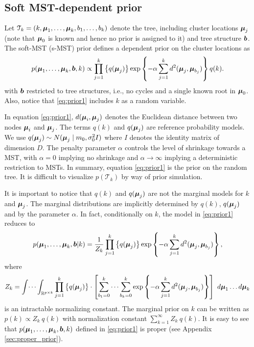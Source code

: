 \subsection{Soft MST-dependent prior}
\label{sec:soft_mst}


Let $\mathcal{T}_k = (k, \mbox{\boldmath $\mu$}_1, \dots, \mbox{\boldmath $\mu$}_k, b_1, \dots, b_{k})$
denote the tree, including cluster locations $\mbox{\boldmath $\mu$}_j$ (note that $\mbox{\boldmath $\mu$}_0$ is known and hence no prior is assigned to it) and tree
structure $\mbox{\boldmath $b$}$.
The soft-MST (s-MST) prior defines a dependent prior on the cluster
locations as 
\begin{equation}
  p(\mbox{\boldmath $\mu$}_1, \dots, \mbox{\boldmath $\mu$}_k, \mbox{\boldmath $b$}, k) \propto \prod_{j=1}^k
  \left\{ q(\mbox{\boldmath $\mu$}_j) \right\} \exp\left\{- \alpha \sum_{j=1}^k
    d^2(\mbox{\boldmath $\mu$}_j, \mbox{\boldmath $\mu$}_{b_j}) \right\} q(k).
\label{eq:prior1}
\end{equation}
with $\mbox{\boldmath $b$}$ restricted to tree structures, i.e., no cycles and a single known root in $\mbox{\boldmath $\mu$}_0$. Also, notice that \eqref{eq:prior1} includes $k$ as a random variable.

In equation \eqref{eq:prior1}, $d(\mbox{\boldmath $\mu$}_i, \mbox{\boldmath $\mu$}_j)$ denotes the Euclidean distance between two nodes $\mbox{\boldmath $\mu$}_i$ and $\mbox{\boldmath $\mu$}_j$. The terms $q(k)$ and $q(\mbox{\boldmath $\mu$}_j)$ are reference probability models. We use $q(\mbox{\boldmath $\mu$}_j)\sim N(\mbox{\boldmath $\mu$}_j \mid m_0, \sigma^2_0 I)$ where $I$ denotes the identity matrix of dimension $D$. The penalty parameter $\alpha$ controls the level of shrinkage towards a MST, with $\alpha=0$ implying no shrinkage and $\alpha \rightarrow \infty$ implying a deterministic restriction to MSTs. In summary, equation \eqref{eq:prior1} is the prior on the random tree. It is difficult to visualize $p(\mathcal{T}_k)$ by way of prior simulation.

It is important to notice that $q(k)$ and $q(\mbox{\boldmath $\mu$}_j)$ are not the marginal models for $k$ and $\mbox{\boldmath $\mu$}_j$. The marginal distributions are implicitly determined by $q(k)$, $q(\mbox{\boldmath $\mu$}_j)$ and by the parameter $\alpha$. In fact, conditionally on $k$, the model in \eqref{eq:prior1} reduces to 
$$
p(\mbox{\boldmath $\mu$}_1, \dots, \mbox{\boldmath $\mu$}_k, \mbox{\boldmath $b$} | k) = \frac{1}{Z_{k}}
\prod_{j=1}^k \left\{ q(\mbox{\boldmath $\mu$}_j) \right\} \exp\left\{- \alpha
  \sum_{j=1}^k d^2(\mbox{\boldmath $\mu$}_j, \mbox{\boldmath $\mu$}_{b_j}) \right\},
$$
where
$$
Z_{k} = \int \dots \int_{\mathbb{R}^{p \times k}} \prod_{j=1}^k \left\{
  q(\mbox{\boldmath $\mu$}_j)\right\} \cdot \left[ \sum_{b_1=0}^k \dots
  \sum_{b_k=0}^k \exp\left\{- \alpha \sum_{j=1}^k d^2(\mbox{\boldmath $\mu$}_j,
    \mbox{\boldmath $\mu$}_{b_j}) \right\} \right] \ d\mbox{\boldmath $\mu$}_1 \dots  d\mbox{\boldmath $\mu$}_k
$$
is an intractable normalizing constant. The marginal prior on $k$ can
be written as $ p(k) \propto Z_{k} \ q(k)$ with normalization constant $\sum^{\infty}_{k=1} Z_{k} \ q(k)$. It is easy to see that $p(\mbox{\boldmath $\mu$}_1, \dots, \mbox{\boldmath $\mu$}_k, \mbox{\boldmath $b$}, k)$
defined in \eqref{eq:prior1} is proper (see Appendix
\ref{sec:proper_prior}).

